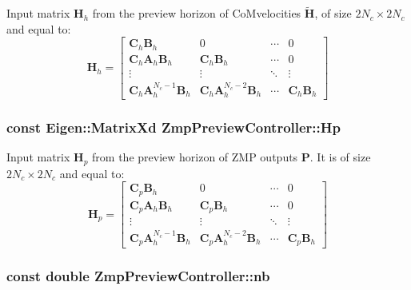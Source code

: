 \-Input matrix $\mathbf{H}_h$ from the preview horizon of \-Co\-Mvelocities $\tilde{\mathbf{H}}$, of size $2N_c \times 2N_c$ and equal to\-: \[ \mathbf{H}_h = \left[\begin{array}{cccc} \mathbf{C}_h\mathbf{B}_h & 0 & \cdots & 0 \\ \mathbf{C}_h\mathbf{A}_h\mathbf{B}_h & \mathbf{C}_h\mathbf{B}_h & \cdots & 0 \\ \vdots & \vdots & \ddots & \vdots \\ \mathbf{C}_h\mathbf{A}^{N_c-1}_h\mathbf{B}_h & \mathbf{C}_h\mathbf{A}^{N_c-2}_h\mathbf{B}_h & \cdots & \mathbf{C}_h\mathbf{B}_h \end{array}\right] \] \hypertarget{classZmpPreviewController_a32ab17a3be30490e4a1e874bf3581843}{
\subsubsection[{\-Hp}]{\setlength{\rightskip}{0pt plus 5cm}const \-Eigen\-::\-Matrix\-Xd {\bf \-Zmp\-Preview\-Controller\-::\-Hp}}}\label{classZmpPreviewController_a32ab17a3be30490e4a1e874bf3581843}
\-Input matrix $\mathbf{H}_p$ from the preview horizon of \-Z\-M\-P outputs $\mathbf{P}$. \-It is of size $2N_c \times 2N_c$ and equal to\-: \[ \mathbf{H}_p = \left[\begin{array}{cccc} \mathbf{C}_p\mathbf{B}_h & 0 & \cdots & 0 \\ \mathbf{C}_p\mathbf{A}_h\mathbf{B}_h & \mathbf{C}_p\mathbf{B}_h & \cdots & 0 \\ \vdots & \vdots & \ddots & \vdots \\ \mathbf{C}_p\mathbf{A}^{N_c-1}_h\mathbf{B}_h & \mathbf{C}_p\mathbf{A}^{N_c-2}_h\mathbf{B}_h & \cdots & \mathbf{C}_p\mathbf{B}_h \end{array}\right] \] \hypertarget{classZmpPreviewController_a6716ee4c94e6f91e608ee1e29fbc7051}{
\subsubsection[{nb}]{\setlength{\rightskip}{0pt plus 5cm}const double {\bf \-Zmp\-Preview\-Controller\-::nb}}}\label{classZmpPreviewController_a6716ee4c94e6f91e608ee1e29fbc7051}
